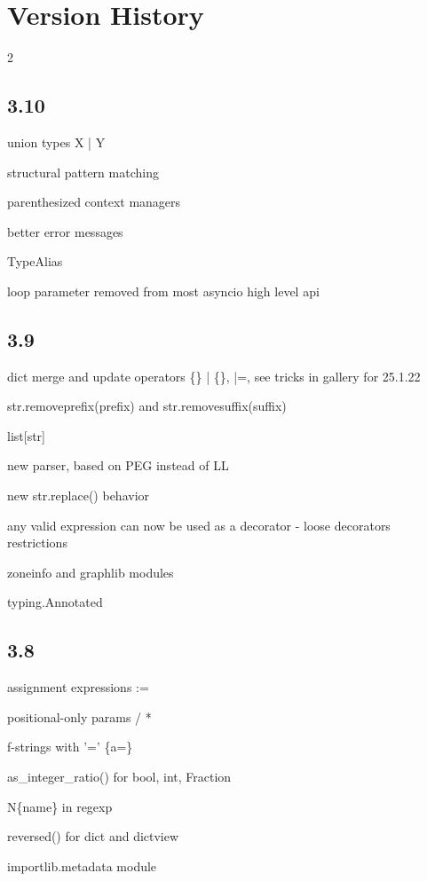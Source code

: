 \documentclass [8pt] {extarticle}
\begin{document}
    \section {Version History}

    \begin {multicols} {2}

    \subsection {3.10}

    union types X | Y

    structural pattern matching

    parenthesized context managers

    better error messages

    TypeAlias

    loop parameter removed from most asyncio high level api

    \subsection {3.9}

    dict merge and update operators \{\} | \{\}, |=, see tricks in gallery for 25.1.22

    str.removeprefix(prefix) and str.removesuffix(suffix)

    list[str]

    new parser, based on PEG instead of LL

    new str.replace() behavior

    any valid expression can now be used as a decorator - loose decorators restrictions

    zoneinfo and graphlib modules

    typing.Annotated

    \subsection {3.8}

    assignment expressions :=

    positional-only params / *

    f-strings with '=' \{a=\}

    as\_integer\_ratio() for bool, int, Fraction

    N\{name\} in regexp

    reversed() for dict and dictview

    importlib.metadata module


\end{multicols}
\end{document}
